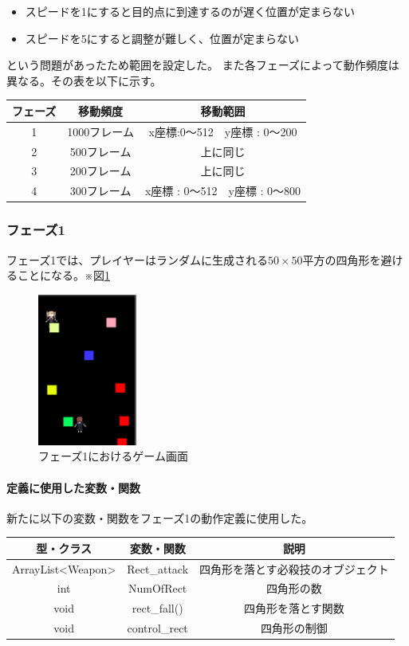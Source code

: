 \documentclass[a4paper,titlepage,11pt]{ltjsarticle}
\begin{document}
\begin{itemize}
	\item スピードを1にすると目的点に到達するのが遅く位置が定まらない
	\item スピードを5にすると調整が難しく、位置が定まらない
\end{itemize}
という問題があったため範囲を設定した。
また各フェーズによって動作頻度は異なる。その表を以下に示す。
\begin{table}[H]
	\centering
	\begin{tabular}{|c|c|c|}
		\hline
		フェーズ & 移動頻度 & 移動範囲\\ \hline \hline
		1 & 1000フレーム & x座標:0～512　y座標 : 0～200\\ \hline
		2 & 500フレーム & 上に同じ\\ \hline
		3 & 200フレーム & 上に同じ\\ \hline
		4 & 300フレーム & x座標 : 0～512　y座標 : 0～800\\ \hline
	\end{tabular}
\end{table}
\subsubsection{フェーズ1}
フェーズ1では、プレイヤーはランダムに生成される$50 \times 50$平方の四角形を避けることになる。※図\ref{phase1}
\begin{figure}[H]
\begin{center}
\includegraphics*[height = 5cm]{phase1.png}
\caption{フェーズ1におけるゲーム画面}
\label{phase1}
\end{center}
\end{figure}
\paragraph{定義に使用した変数・関数}
新たに以下の変数・関数をフェーズ1の動作定義に使用した。
\begin{table}[H]
	\centering
	\begin{tabular}{|c|c|c|}
		\hline
		型・クラス & 変数・関数 & 説明 \\ \hline \hline
		ArrayList<Weapon> & Rect\_attack & 四角形を落とす必殺技のオブジェクト \\ \hline
		int & NumOfRect & 四角形の数 \\ \hline
		void & rect\_fall() & 四角形を落とす関数 \\ \hline
		void & control\_rect & 四角形の制御 \\ \hline
	\end{tabular}
\end{table}
\end{document}
